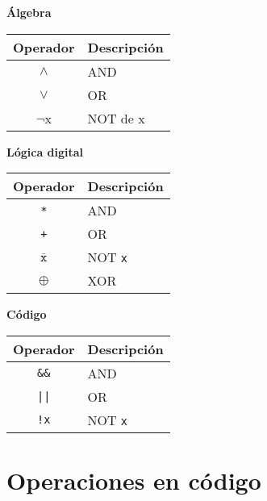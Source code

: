 \documentclass[a4paper,10pt]{article}
\begin{document}
\begin{multicols}{3}
    \begin{center}
    \textbf{Álgebra}\\
    \begin{tabular}{c|p{2.15cm}}
    \small Operador & \small Descripción\\
    \hline
    $\wedge$    & \small AND \\
    $\vee$      & \small OR \\
    $\neg$x      & \small NOT de x\\
    \end{tabular}
    \end{center}
\columnbreak
    \begin{center}
    \textbf{Lógica digital}\\
    \begin{tabular}{c|p{2.15cm}}
    \small Operador & \small Descripción\\
    \hline
    \verb|*|    & \small AND \\
    \verb|+|    & \small OR \\
    $\overline{\texttt{x}}$ & \small NOT \verb|x| \\
    $\oplus$    & \small XOR \\
    \end{tabular}
    \end{center}
\columnbreak
    \begin{center}
    \textbf{Código}\\
    \begin{tabular}{c|p{2.15cm}}
    \small Operador & \small Descripción\\
    \hline
    \verb|&&|    & \small AND \\
    \verb.||.    & \small OR \\
    \verb|!x|    & \small NOT \verb|x| \\
    \end{tabular}
    \end{center}
\end{multicols}

\section*{Operaciones en código}
 
\end{document}
